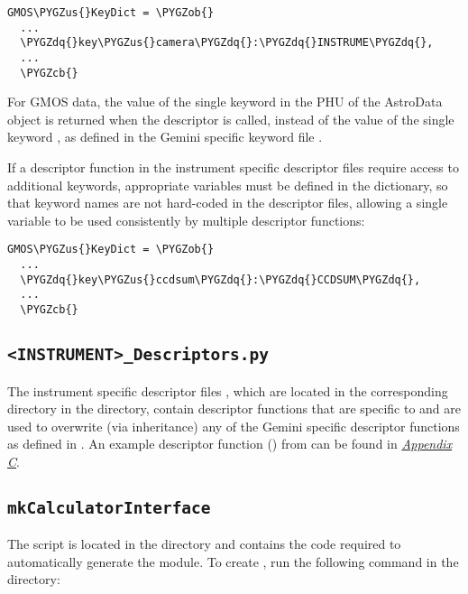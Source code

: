 \documentclass[letterpaper,10pt,english]{sphinxmanual}
\def\PYGZus{\char`\_}
\def\PYGZob{\char`\{}
\def\PYGZcb{\char`\}}
\def\PYGZdq{\char`\"}
\begin{document}
\begin{Verbatim}[commandchars=\\\{\}]
GMOS\PYGZus{}KeyDict = \PYGZob{}
  ...
  \PYGZdq{}key\PYGZus{}camera\PYGZdq{}:\PYGZdq{}INSTRUME\PYGZdq{},
  ...
  \PYGZcb{}
\end{Verbatim}

For GMOS data, the value of the single keyword  in the PHU of the
AstroData object is returned when the  descriptor is called, instead
of the value of the single keyword , as defined in the Gemini
specific keyword file .

If a descriptor function in the instrument specific descriptor files
 require access to additional keywords,
appropriate variables must be defined in the 
dictionary, so that keyword names are not hard-coded in the descriptor files,
allowing a single variable to be used consistently by multiple descriptor
functions:

\begin{Verbatim}[commandchars=\\\{\}]
GMOS\PYGZus{}KeyDict = \PYGZob{}
  ...
  \PYGZdq{}key\PYGZus{}ccdsum\PYGZdq{}:\PYGZdq{}CCDSUM\PYGZdq{},
  ...
  \PYGZcb{}
\end{Verbatim}


\subsection{\texttt{\textless{}INSTRUMENT\textgreater{}\_Descriptors.py}}
\label{coding:instrument-descriptors-py}
The instrument specific descriptor files , which
are located in the corresponding  directory in the
 directory, contain descriptor
functions that are specific to  and are used to overwrite (via
inheritance) any of the Gemini specific descriptor functions as defined in
. An example descriptor function ()
from  can be found in {\hyperref[appendices/appendixC:appendix-descriptor]{\emph{Appendix C}}}.


\subsection{\texttt{mkCalculatorInterface}}
\label{coding:mkcalculatorinterface}
The  script is located in the 
directory and contains the code required to automatically generate the
 module. To create
, run the following command in the
 directory:
\end{document}
